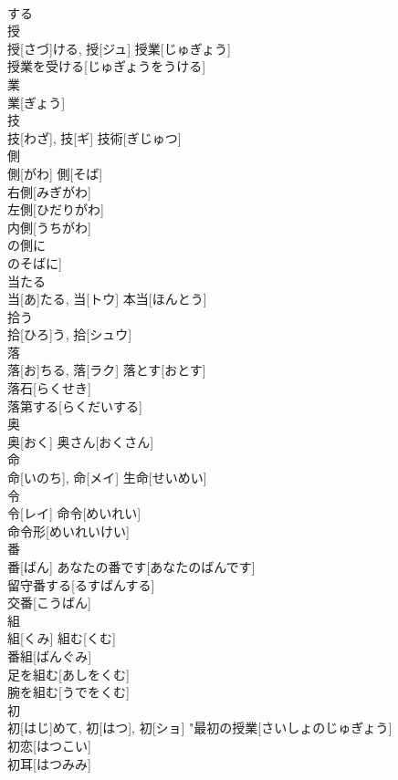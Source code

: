 \documentclass[8pt]{extreport}
\begin{document}
\begin{CJK}{UTF8}{min}
\\	する 
\\	授	
\\	授[さづ]ける, 授[ジュ]	授業[じゅぎょう] 
\\	授業を受ける[じゅぎょうをうける] 
\\	業	
\\	業[ぎょう]	
\\	技	
\\	技[わざ], 技[ギ]	技術[ぎじゅつ] 
\\	側	
\\	側[がわ]	側[そば] 
\\	右側[みぎがわ] 
\\	左側[ひだりがわ] 
\\	内側[うちがわ] 
\\	の側に
\\	のそばに] 
\\	当たる	
\\	当[あ]たる, 当[トウ]	本当[ほんとう] 
\\	拾う	
\\	拾[ひろ]う, 拾[シュウ]	
\\	落	
\\	落[お]ちる, 落[ラク]	落とす[おとす] 
\\	落石[らくせき] 
\\	落第する[らくだいする] 
\\	奥	
\\	奥[おく]	奥さん[おくさん] 
\\	命	
\\	命[いのち], 命[メイ]	生命[せいめい] 
\\	令	
\\	令[レイ]	命令[めいれい] 
\\	命令形[めいれいけい] 
\\	番	
\\	番[ばん]	あなたの番です[あなたのばんです] 
\\	留守番する[るすばんする] 
\\	交番[こうばん] 
\\	組	
\\	組[くみ]	組む[くむ] 
\\	番組[ばんぐみ] 
\\	足を組む[あしをくむ] 
\\	腕を組む[うでをくむ] 
\\	初	
\\	初[はじ]めて, 初[はつ], 初[ショ]	"最初の授業[さいしょのじゅぎょう] 
\\	初恋[はつこい] 
\\	初耳[はつみみ] 

\end{CJK}
\end{document}
